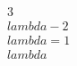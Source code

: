 \documentclass[preview]{standalone}
\begin{document}
\begin{align*}
3\\lambda - 2\\lambda = 1\\lambda
\end{align*}
\end{document}
